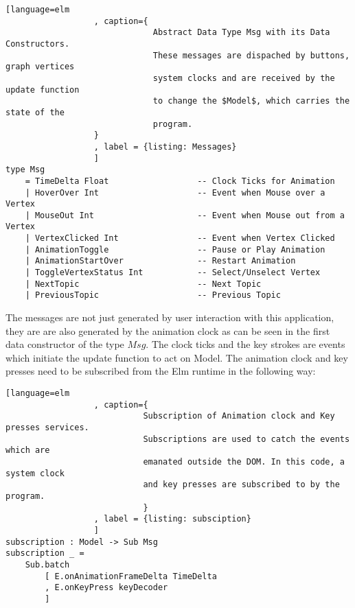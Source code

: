 \begin{lstlisting}[language=elm
                  , caption={
                              Abstract Data Type Msg with its Data Constructors.
                              These messages are dispached by buttons, graph vertices
                              system clocks and are received by the update function
                              to change the $Model$, which carries the state of the
                              program.
                  }
                  , label = {listing: Messages}
                  ]
type Msg
    = TimeDelta Float                  -- Clock Ticks for Animation
    | HoverOver Int                    -- Event when Mouse over a Vertex                              
    | MouseOut Int                     -- Event when Mouse out from a Vertex                               
    | VertexClicked Int                -- Event when Vertex Clicked                              
    | AnimationToggle                  -- Pause or Play Animation
    | AnimationStartOver               -- Restart Animation
    | ToggleVertexStatus Int           -- Select/Unselect Vertex
    | NextTopic                        -- Next Topic
    | PreviousTopic                    -- Previous Topic

\end{lstlisting}

The messages are not just generated by user interaction with this application,
they are are also generated by the animation clock as can be seen in
the first data constructor of the type $Msg$.  The clock ticks and the key
strokes are events which initiate the update function to act on Model.  The
animation clock and key presses need to be subscribed from the Elm runtime in
the following way:

\begin{lstlisting}[language=elm
                  , caption={
                            Subscription of Animation clock and Key presses services.
                            Subscriptions are used to catch the events which are
                            emanated outside the DOM. In this code, a system clock
                            and key presses are subscribed to by the program.
                            }
                  , label = {listing: subsciption}
                  ]
subscription : Model -> Sub Msg
subscription _ =
    Sub.batch
        [ E.onAnimationFrameDelta TimeDelta
        , E.onKeyPress keyDecoder
        ]
\end{lstlisting}

